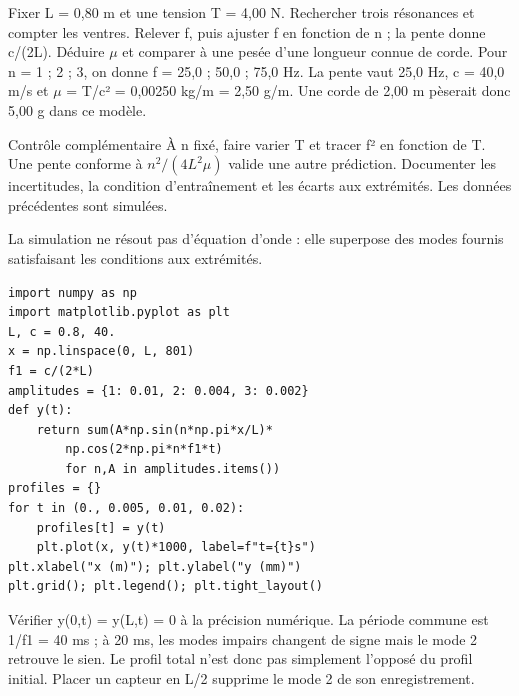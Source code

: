 Fixer L = 0,80 m et une tension T = 4,00 N. Rechercher trois résonances et compter les ventres. Relever f, puis ajuster f en fonction de n ; la pente donne c/(2L). Déduire \ensuremath{\mu} et comparer à une pesée d’une longueur connue de corde.
Pour n = 1 ; 2 ; 3, on donne f = 25,0 ; 50,0 ; 75,0 Hz. La pente vaut 25,0 Hz, c = 40,0 m/s et \ensuremath{\mu} = T/c² = 0,00250 kg/m = 2,50 g/m. Une corde de 2,00 m pèserait donc 5,00 g dans ce modèle.
\begin{methode}{Contrôle complémentaire}
À n fixé, faire varier T et tracer f² en fonction de T. Une pente conforme à $n^2/(4L^2\mu)$ valide une autre prédiction. Documenter les incertitudes, la condition d’entraînement et les écarts aux extrémités. Les données précédentes sont simulées.
\end{methode}


La simulation ne résout pas d’équation d’onde : elle superpose des modes fournis satisfaisant les conditions aux extrémités.
\begin{verbatim}
import numpy as np
import matplotlib.pyplot as plt
L, c = 0.8, 40.
x = np.linspace(0, L, 801)
f1 = c/(2*L)
amplitudes = {1: 0.01, 2: 0.004, 3: 0.002}
def y(t):
    return sum(A*np.sin(n*np.pi*x/L)*
        np.cos(2*np.pi*n*f1*t)
        for n,A in amplitudes.items())
profiles = {}
for t in (0., 0.005, 0.01, 0.02):
    profiles[t] = y(t)
    plt.plot(x, y(t)*1000, label=f"t={t}s")
plt.xlabel("x (m)"); plt.ylabel("y (mm)")
plt.grid(); plt.legend(); plt.tight_layout()
\end{verbatim}
Vérifier y(0,t) = y(L,t) = 0 à la précision numérique. La période commune est 1/f1 = 40 ms ; à 20 ms, les modes impairs changent de signe mais le mode 2 retrouve le sien. Le profil total n’est donc pas simplement l’opposé du profil initial. Placer un capteur en L/2 supprime le mode 2 de son enregistrement.


